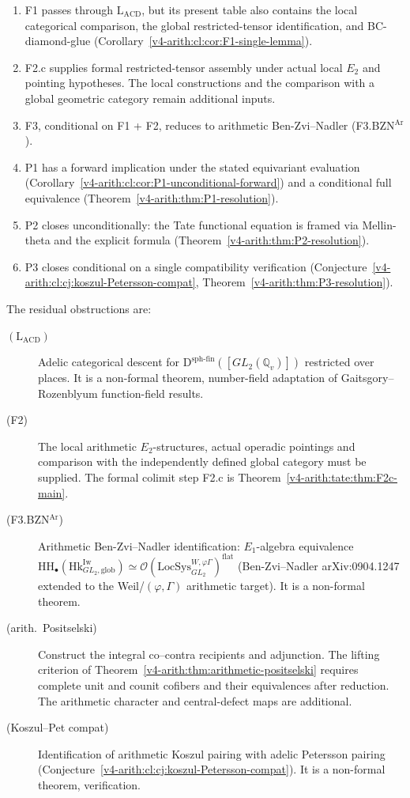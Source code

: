 \begin{enumerate}
\item F1 passes through \(\mathrm{L}_{\mathrm{ACD}}\), but its present
table also contains the local categorical comparison, the global
restricted-tensor identification, and BC-diamond-glue
(Corollary~\ref{v4-arith:cl:cor:F1-single-lemma}).
\item F2.c supplies formal restricted-tensor assembly under actual
local \(E_2\) and pointing hypotheses. The local constructions
and the comparison with a global geometric category remain
additional inputs.
\item F3, conditional on F1 + F2, reduces to arithmetic Ben-Zvi--Nadler
(F3.BZN\(^{\mathrm{Ar}}\)).
\item P1 has a forward implication under the stated equivariant evaluation
(Corollary~\ref{v4-arith:cl:cor:P1-unconditional-forward}) and a conditional
full equivalence (Theorem~\ref{v4-arith:thm:P1-resolution}).
\item P2 closes unconditionally: the Tate functional equation is
framed via Mellin-theta and the explicit formula
(Theorem~\ref{v4-arith:thm:P2-resolution}).
\item P3 closes conditional on a single compatibility verification
(Conjecture~\ref{v4-arith:cl:cj:koszul-Petersson-compat},
Theorem~\ref{v4-arith:thm:P3-resolution}).
\end{enumerate}

The residual obstructions are:
\begin{description}
\item[\((\mathrm{L}_{\mathrm{ACD}})\)] Adelic categorical descent for
\(\mathrm{D}^{\mathrm{sph\text{-}fin}}([GL_{2}(\mathbb{Q}_{v})])\)
restricted over places. It is a non-formal theorem, number-field adaptation
of Gaitsgory--Rozenblyum function-field results.
\item[(F2)] The local arithmetic \(E_2\)-structures, actual
operadic pointings and comparison with the independently defined
global category must be supplied. The formal colimit step F2.c
is Theorem~\ref{v4-arith:tate:thm:F2c-main}.
\item[(F3.BZN\(^{\mathrm{Ar}}\))] Arithmetic Ben-Zvi--Nadler
identification: \(E_{1}\)-algebra equivalence
\(\mathrm{HH}_{\bullet}(\mathrm{Hk}^{\mathrm{Iw}}_{GL_{2},\mathrm{glob}})\simeq\mathcal{O}(\mathrm{LocSys}^{W,\varphi\Gamma}_{GL_{2}})^{\mathrm{flat}}\)
(Ben-Zvi--Nadler arXiv:0904.1247 extended to the
Weil/\((\varphi,\Gamma)\) arithmetic target).
It is a non-formal theorem.
\item[(arith.~Positselski)] Construct the integral co--contra
recipients and adjunction. The lifting criterion of
Theorem~\ref{v4-arith:thm:arithmetic-positselski} requires complete
unit and counit cofibers and their equivalences after reduction.
The arithmetic character and central-defect maps are additional.
\item[(Koszul--Pet compat)] Identification of arithmetic Koszul
pairing with adelic Petersson pairing
(Conjecture~\ref{v4-arith:cl:cj:koszul-Petersson-compat}). It is a non-formal theorem,
verification.
\end{description}

